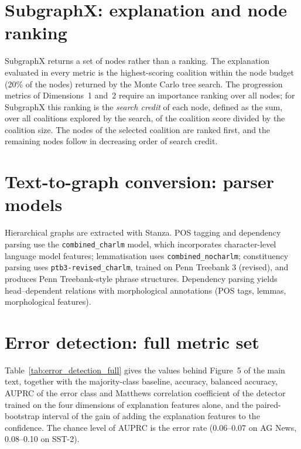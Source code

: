 \section{SubgraphX: explanation and node ranking}

SubgraphX returns a set of nodes rather than a ranking. The explanation evaluated in every metric is the highest-scoring coalition within the node budget (20\% of the nodes) returned by the Monte Carlo tree search. The progression metrics of Dimensions~1 and~2 require an importance ranking over all nodes; for SubgraphX this ranking is the \emph{search credit} of each node, defined as the sum, over all coalitions explored by the search, of the coalition score divided by the coalition size. The nodes of the selected coalition are ranked first, and the remaining nodes follow in decreasing order of search credit.

\section{Text-to-graph conversion: parser models}
Hierarchical graphs are extracted with Stanza. POS tagging and dependency parsing use the \texttt{combined\_charlm} model, which incorporates character-level language model features; lemmatisation uses \texttt{combined\_nocharlm}; constituency parsing uses \texttt{ptb3-revised\_charlm}, trained on Penn Treebank 3 (revised), and produces Penn Treebank-style phrase structures. Dependency parsing yields head--dependent relations with morphological annotations (POS tags, lemmas, morphological features).


\section{Error detection: full metric set}

Table~\ref{tab:error_detection_full} gives the values behind Figure~5 of the main text, together with the majority-class baseline, accuracy, balanced accuracy, AUPRC of the error class and Matthews correlation coefficient of the detector trained on the four dimensions of explanation features alone, and the paired-bootstrap interval of the gain of adding the explanation features to the confidence. The chance level of AUPRC is the error rate (0.06--0.07 on AG News, 0.08--0.10 on SST-2).

